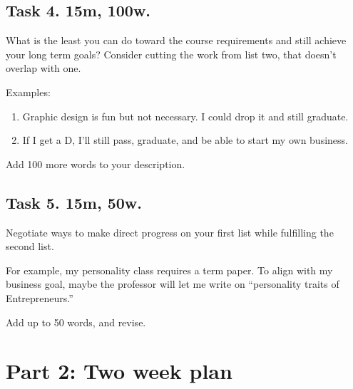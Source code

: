 \documentclass[
]{book}
\providecommand{\tightlist}{%
  \setlength{\itemsep}{0pt}\setlength{\parskip}{0pt}}
\begin{document}
\hypertarget{task-4.-15m-100w.}{%
\subsection{\texorpdfstring{\textbf{Task 4. 15m, 100w.}}{Task 4. 15m, 100w.}}\label{task-4.-15m-100w.}}

What is the least you can do toward the course requirements and still achieve your long term goals?
Consider cutting the work from list two,
that doesn't overlap with one.

Examples:

\begin{enumerate}
\def\labelenumi{\arabic{enumi}.}
\tightlist
\item
  Graphic design is fun but not necessary. I could drop it and
  still graduate.
\item
  If I get a D, I'll still pass, graduate, and be able to start my own
  business.
\end{enumerate}

Add 100 more words to your description.

\hypertarget{task-5.-15m-50w.}{%
\subsection{\texorpdfstring{\textbf{Task 5. 15m, 50w.}}{Task 5. 15m, 50w.}}\label{task-5.-15m-50w.}}

Negotiate ways to make direct progress on your first list while fulfilling the second list.

For example, my personality class requires a term paper.
To align with my business goal, maybe the professor will let me write
on ``personality traits of Entrepreneurs.''

Add up to 50 words, and revise.

\hypertarget{part-2-two-week-plan}{%
\section{Part 2: Two week plan}\label{part-2-two-week-plan}}
\end{document}
